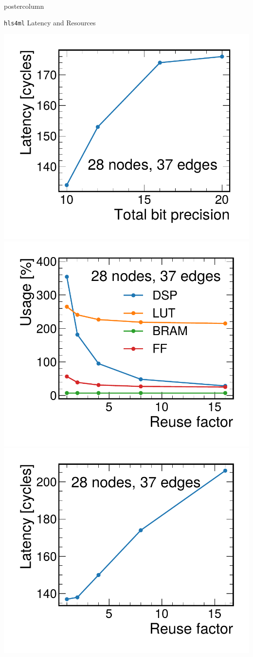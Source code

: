 \documentclass[final,hyperref={pdfpagelabels=false}]{beamer}
\newcommand{\hlsfml}{{\texttt{hls4ml}}\xspace}
\begin{document}
\begin{frame}
\begin{columns}
\begin{column}{.49\textwidth}
\begin{beamercolorbox}[center,wd=\textwidth]{postercolumn}
\begin{minipage}[T]{.95\textwidth}
{\begin{block}{{\hlsfml} Latency and Resources}
\begin{itemize}
\begin{center}
                    \includegraphics[width=0.33\linewidth]{figures/Latency_vs_BP.pdf}
                    \includegraphics[width=0.33\linewidth]{figures/Resources_vs_RF.pdf}
                    \includegraphics[width=0.33\linewidth]{figures/Latency_vs_RF.pdf}
                \end{center}
              \end{itemize}
            \end{block}
            
}
\end{minipage}
\end{beamercolorbox}
\end{column}
\end{columns}
\end{frame}
\end{document}
